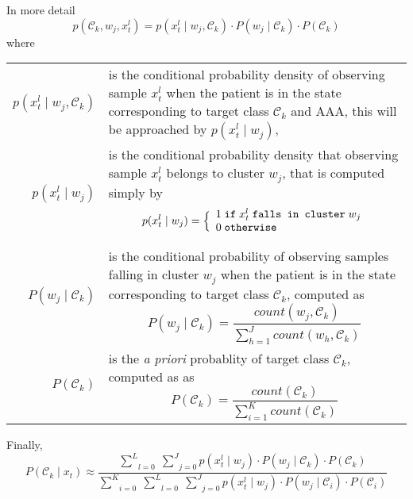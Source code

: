 \documentclass[a4paper,12pt]{article}
\begin{document}
In more detail
\[
p(\mathcal{C}_{k}, w_{j}, x_{t}^{l}) =
p(x_{t}^{l} \mid w_{j}, \mathcal{C}_{k}) \cdot P(w_{j} \mid \mathcal{C}_{k}) \cdot P(\mathcal{C}_{k})
\]
where
\begin{center}
\begin{tabular}{rp{110mm}}
$p(x_{t}^{l} \mid w_{j}, \mathcal{C}_{k})$ & is the conditional probability density of observing sample
                                             $x_{t}^{l}$ when the patient is in the state corresponding
                                             to target class $\mathcal{C}_{k}$ and AAA,
                                             this will be approached by $p(x_{t}^{l} \mid w_{j})$, \\
$p(x_{t}^{l} \mid w_{j})$ & is the conditional probability density that observing sample $x_{t}^{l}$
                            belongs to cluster $w_{j}$, that is computed simply by
                            $$p(x_{t}^{l} \mid w_{j}) = \Bigl\{ \begin{array}{l} 1 \; \texttt{if} \; x_{t}^{l} \; \texttt{falls in cluster} \; w_{j} \\ 0 \; \texttt{otherwise} \\ \end{array}$$ \\

$P(w_{j} \mid \mathcal{C}_{k})$ & is the conditional probability of observing samples falling in cluster $w_{j}$ when
                                  the patient is in the state corresponding to target class $\mathcal{C}_{k}$, computed
                                  as $$P(w_{j} \mid \mathcal{C}_{k}) = \frac{count(w_{j}, \mathcal{C}_{k})}{\sum_{h=1}^{J} count(w_{h}, \mathcal{C}_{k})}$$ \\

$P(\mathcal{C}_{k})$ & is the \emph{a priori} probablity of target class $\mathcal{C}_{k}$, computed as 
                                  as $$P(\mathcal{C}_{k}) = \frac{count(\mathcal{C}_{k})}{\sum_{i=1}^{K} count(\mathcal{C}_{k})}$$ \\
\end{tabular}
\end{center}

Finally,
\[
P(\mathcal{C}_{k} \mid x_{t}) \approx
    \frac{\underset{l=0}{\overset{L}{\sum}} \; \underset{j=0}{\overset{J}{\sum}}
        p(x_{t}^{l} \mid w_{j}) \cdot P(w_{j} \mid \mathcal{C}_{k}) \cdot P(\mathcal{C}_{k})}%
        {\underset{i=0}{\overset{K}{\sum}} \; \underset{l=0}{\overset{L}{\sum}} \; \underset{j=0}{\overset{J}{\sum}}
            p(x_{t}^{l} \mid w_{j}) \cdot P(w_{j} \mid \mathcal{C}_{i}) \cdot P(\mathcal{C}_{i})}
\]
\end{document}
